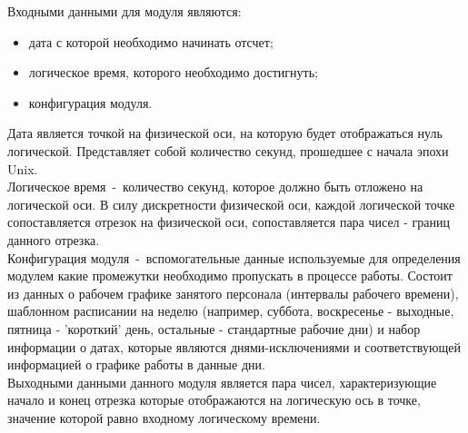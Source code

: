 \indent Входными данными для модуля являются:
\begin{itemize}
	\item дата с которой необходимо начинать отсчет;
	\item логическое время, которого необходимо достигнуть;
	\item конфигурация модуля.
\end{itemize}
\indent Дата является точкой на физической оси, на которую будет отображаться нуль логической. Представляет собой количество секунд, прошедшее с начала эпохи Unix.\\
\indent Логическое время~-~количество секунд, которое должно быть отложено на логической оси. В силу дискретности физической оси, каждой логической точке сопоставляется отрезок на физической оси, сопоставляется пара чисел - границ данного отрезка.\\
\indent Конфигурация модуля~-~вспомогательные данные используемые для определения модулем какие промежутки необходимо пропускать в процессе работы. 
Состоит из данных о рабочем графике занятого персонала (интервалы рабочего времени), шаблонном расписании на неделю (например, суббота, воскресенье - выходные, пятница - 'короткий' день, остальные - стандартные рабочие дни) и набор информации о датах, которые являются днями-исключениями и соответствующей информацией о графике работы в данные дни.\\
\indent Выходными данными данного модуля является пара чисел, характеризующие начало и конец отрезка которые отображаются на логическую ось в точке, значение которой равно входному логическому времени.\\

